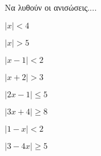 Να λυθούν οι ανισώσεις....
\begin{multicols}{4}
\begin{alist}
\item $ \left|x\right|<4 $
\item $ \left|x\right|>5 $
\item $ \left|x-1\right|<2 $
\item $ \left|x+2\right|>3 $
\item $ \left|2x-1\right|\leq5 $
\item $ \left|3x+4\right|\geq8 $
\item $ \left|1-x\right|<2 $
\item $ \left|3-4x\right|\geq5 $
\end{alist}
\end{multicols}
